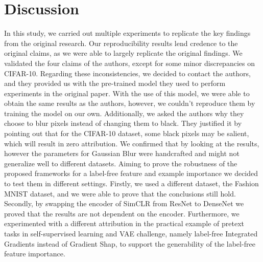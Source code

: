 
\section{Discussion}


In this study, we carried out multiple experiments to replicate the key findings from the original research. Our reproducibility results lend credence to the original claims, as we were able to largely replicate the original findings. We validated the four claims of the authors, except for some minor discrepancies on CIFAR-10. Regarding these inconsistencies, we decided to contact the authors, and they provided us with the pre-trained model they used to perform experiments in the original paper. With the use of this model, we were able to obtain the same results as the authors, however, we couldn't reproduce them by training the model on our own. Additionally, we asked the authors why they choose to blur pixels instead of changing them to black. They justified it by pointing out that for the CIFAR-10 dataset, some black pixels may be salient, which will result in zero attribution. We confirmed that by looking at the results, however the parameters for Gaussian Blur were handcrafted and might not generalize well to different datasets. Aiming to prove the robustness of the proposed frameworks for a label-free feature and example importance we decided to test them in different settings. Firstly, we used a different dataset, the Fashion MNIST dataset, and we were able to prove that the conclusions still hold. Secondly, by swapping the encoder of SimCLR from ResNet to DenseNet we proved that the results are not dependent on the encoder. Furthermore, we experimented with a different attribution in the practical example of pretext tasks in self-supervised learning and VAE challenge, namely label-free Integrated Gradients instead of Gradient Shap, to support the generability of the label-free feature importance.


